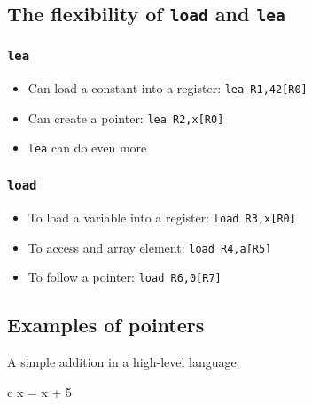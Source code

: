 \subsection[The flexibility of LOAD and LEA]{The flexibility of \texttt{load} and \texttt{lea}}\label{sub:the_flexibility_of_load_and_lea}

\subsubsection[LEA]{\texttt{lea}}\label{ssub:lea}

\begin{itemize}
    \item Can load a constant into a register: \texttt{lea R1,42[R0]}
    \item Can create a pointer: \texttt{lea R2,x[R0]}
    \item \texttt{lea} can do even more
\end{itemize}

\subsubsection[LOAD]{\texttt{load}}\label{ssub:load}

\begin{itemize}
    \item To load a variable into a register: \texttt{load R3,x[R0]}
    \item To access and array element: \texttt{load R4,a[R5]}
    \item To follow a pointer: \texttt{load R6,0[R7]}
\end{itemize}

\subsection{Examples of pointers}\label{sub:examples_of_pointers}

\begin{highlight}{A simple addition in a high-level language}
    \begin{code}{c}
        x = x + 5
    \end{code}
\end{highlight}

